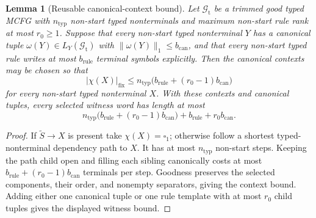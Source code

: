 \documentclass[11pt]{article}
\numberwithin{equation}{section}
\theoremstyle{plain}
\newtheorem{lemma}[theorem]{Lemma}
\theoremstyle{definition}
\theoremstyle{remark}
\newcommand{\blank}{\square}
\theoremstyle{plain}
\begin{document}
\begin{lemma}[Reusable canonical-context bound]

\label{lem:reusable-context-bound}
Let $\mathcal G_{\mathrm t}$ be a trimmed good typed MCFG
with $n_{\mathrm{typ}}$ non-start typed nonterminals and maximum non-start rule rank at most
$r_0\ge1$.  Suppose that every non-start typed nonterminal $Y$ has a canonical tuple
$\omega(Y)\in L_Y(\mathcal G_{\mathrm t})$ with
$\|\omega(Y)\|_1\le b_{\mathrm{can}}$, and that every non-start typed rule writes at
most $b_{\mathrm{rule}}$ terminal symbols explicitly.  Then the
canonical contexts may be chosen so that
\[
  |\chi(X)|_{\mathrm{fix}}
  \le n_{\mathrm{typ}}\bigl(b_{\mathrm{rule}}+(r_0-1)b_{\mathrm{can}}\bigr)
\]
for every non-start typed nonterminal $X$.  With these contexts and canonical tuples,
every selected witness word has length at most
\[
  n_{\mathrm{typ}}\bigl(b_{\mathrm{rule}}+(r_0-1)b_{\mathrm{can}}\bigr)+b_{\mathrm{rule}}+r_0b_{\mathrm{can}}.
\]
\end{lemma}
\begin{proof}
If $\widetilde S\to X$ is present take $\chi(X)=\blank_1$; otherwise follow a
shortest typed-nonterminal dependency path to $X$.  It has at most
$n_{\mathrm{typ}}$ non-start steps.  Keeping the path child open and filling
each sibling canonically costs at most
$b_{\mathrm{rule}}+(r_0-1)b_{\mathrm{can}}$ terminals per step.  Goodness
preserves the selected components, their order, and nonempty separators,
giving the context bound.  Adding either one canonical tuple or one rule
template with at most $r_0$ child tuples gives the displayed witness bound.
\end{proof}
\end{document}
